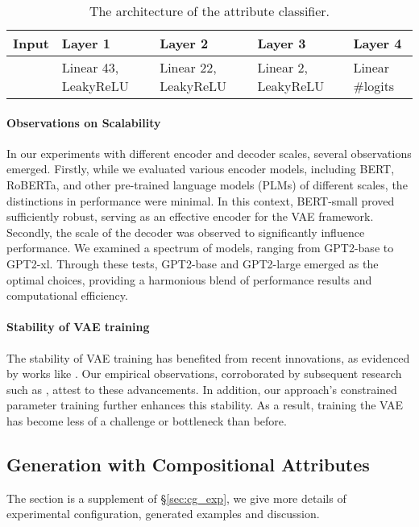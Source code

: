 \documentclass[11pt]{article}
\begin{document}
\begin{table}[ht]
    \centering
    \small
    \begin{tabular}{lllll}
        \toprule
        Input & Layer 1 & Layer 2 & Layer 3 & Layer 4\\\midrule
         &
         Linear 43, LeakyReLU&
         Linear 22, LeakyReLU&
         Linear 2, LeakyReLU&
         Linear \#logits\\\bottomrule
    \end{tabular}
    \caption{The architecture of the attribute classifier.}
    \label{tab:arc_classifier}
\end{table}
\paragraph{Observations on Scalability}
In our experiments with different encoder and decoder scales, several observations emerged. Firstly, while we evaluated various encoder models, including BERT, RoBERTa, and other pre-trained language models (PLMs) of different scales, the distinctions in performance were minimal. In this context, BERT-small proved sufficiently robust, serving as an effective encoder for the VAE framework. Secondly, the scale of the decoder was observed to significantly influence performance. We examined a spectrum of models, ranging from GPT2-base to GPT2-xl. Through these tests, GPT2-base and GPT2-large emerged as the optimal choices, providing a harmonious blend of performance results and computational efficiency.
\paragraph{Stability of VAE training}
The stability of VAE training has benefited from recent innovations, as evidenced by works like \citet{li-etal-2020-optimus}. Our empirical observations, corroborated by subsequent research such as \citet{hu2021causal}, attest to these advancements. In addition, our approach's constrained parameter training further enhances this stability. As a result, training the VAE has become less of a challenge or bottleneck than before.
\subsection{Generation with Compositional Attributes}
The section is a supplement of \S\ref{sec:cg_exp}, we give more details of experimental configuration, generated examples and discussion.
\end{document}
